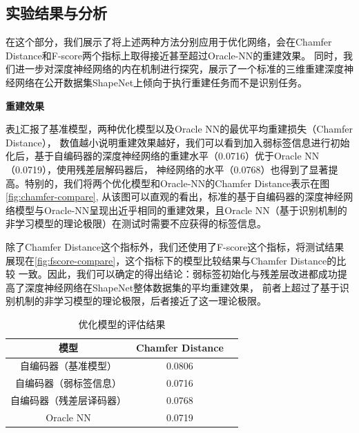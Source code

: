 \documentclass[bachelor, nocolorlinks, printoneside]{seuthesis} %
\begin{document}
\begin{Main}
\FloatBarrier



\subsection{实验结果与分析}
\label{sec:shapenet_result}
在这个部分，我们展示了将上述两种方法分别应用于优化网络，会在Chamfer Distance和F-score两个指标上取得接近甚至超过Oracle-NN的重建效果。
同时，我们进一步对深度神经网络的内在机制进行探究，展示了一个标准的三维重建深度神经网络在公开数据集ShapeNet上倾向于执行重建任务而不是识别任务。

\noindent
\textbf{重建效果}

表\ref{table:metric_optimal_baseline}汇报了基准模型，两种优化模型以及Oracle NN的最优平均重建损失（Chamfer Distance），
数值越小说明重建效果越好，我们可以看到加入弱标签信息进行初始化后，基于自编码器的深度神经网络的重建水平（0.0716）优于Oracle NN（0.0719），使用残差层解码器后，
神经网络的水平（0.0768）也得到了显著提高。特别的，我们将两个优化模型和Oracle-NN的Chamfer Distance表示在图\ref{fig:chamfer-compare},
从该图可以直观的看出，标准的基于自编码器的深度神经网络模型与Oracle-NN呈现出近乎相同的重建效果，且Oracle NN（基于识别机制的非学习模型的理论极限）在测试时需要不应获得的标签信息。

除了Chamfer Distance这个指标外，我们还使用了F-score这个指标，将测试结果展现在\ref{fig:fscore-compare}，这个指标下的模型比较结果与Chamfer Distance的比较
一致。因此，我们可以确定的得出结论：弱标签初始化与残差层改进都成功提高了深度神经网络在ShapeNet整体数据集的平均重建效果，
前者上超过了基于识别机制的非学习模型的理论极限，后者接近了这一理论极限。

\begin{table}
    \centering
    \caption{优化模型的评估结果}
    \begin{tabular}{ccc} 
    \hline
    模型                      & Chamfer Distance \\
    \hline
    自编码器（基准模型）            & 0.0806     \\
    自编码器（弱标签信息）           & 0.0716                             \\
    自编码器（残差层译码器）         & 0.0768                         \\
    Oracle NN & 0.0719                           \\
    \hline
    \end{tabular}
    \label{table:metric_optimal_baseline}
\end{table}


\end{Main}
\end{document}
